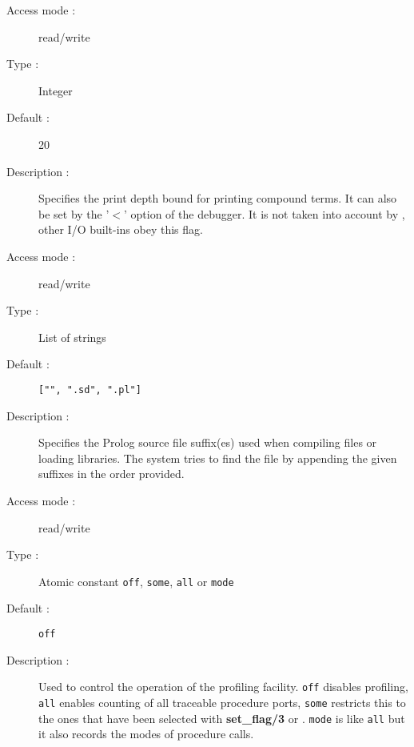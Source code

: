 \begin{description}
\begin{description}
\item[Access mode : ] read/write 
\item[Type : ] Integer 
\item[Default : ] 20
\item[Description : ] Specifies the print depth bound for printing
compound terms. It can also be set by the '$<$' option of the debugger.
It is not taken into account by ,
other I/O built-ins obey this flag.
\end{description}

\begin{description}
\item[Access mode : ] read/write 
\item[Type : ] List of strings
\item[Default : ] {\tt ["", ".sd", ".pl"]}
\item[Description : ] Specifies the Prolog source file suffix(es) used when 
compiling files or loading libraries.
The system tries to find the file by appending
the given suffixes in the order provided.
\end{description}

\begin{description}
\item[Access mode : ] read/write 
\item[Type : ] Atomic constant {\tt off}, {\tt some}, {\tt all} or {\tt mode}
\item[Default : ] {\tt off}
\item[Description : ] Used to control the operation of the profiling facility.
{\tt off} disables profiling, {\tt all} enables counting of all traceable
procedure ports, {\tt some} restricts this to the ones that have been
selected with {\bf set\_flag/3} or . {\tt mode} is like
{\tt all} but it also records the modes of procedure calls.
\end{description}


\end{description}
